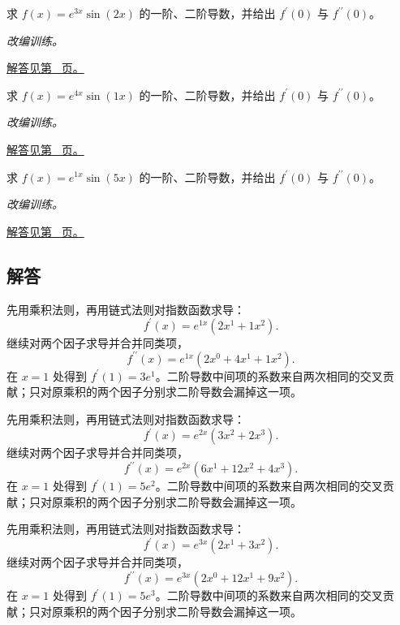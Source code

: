\documentclass[UTF8,12pt,a4paper,fontset=fandol]{ctexart}
\begin{document}
\begin{example}[指数与三角函数的复合求导]\label{ex:c8q22}
求 $f(x)=e^{3x}\sin(2x)$ 的一阶、二阶导数，并给出 $f^{\prime}(0)$ 与 $f^{\prime\prime}(0)$。
\par\textit{改编训练。}\par\hyperref[ans:c8q22]{解答见第~\pageref{ans:c8q22} 页。}
\end{example}
\begin{example}[指数与三角函数的复合求导]\label{ex:c8q23}
求 $f(x)=e^{4x}\sin(1x)$ 的一阶、二阶导数，并给出 $f^{\prime}(0)$ 与 $f^{\prime\prime}(0)$。
\par\textit{改编训练。}\par\hyperref[ans:c8q23]{解答见第~\pageref{ans:c8q23} 页。}
\end{example}
\begin{example}[指数与三角函数的复合求导]\label{ex:c8q24}
求 $f(x)=e^{1x}\sin(5x)$ 的一阶、二阶导数，并给出 $f^{\prime}(0)$ 与 $f^{\prime\prime}(0)$。
\par\textit{改编训练。}\par\hyperref[ans:c8q24]{解答见第~\pageref{ans:c8q24} 页。}
\end{example}
\subsection{解答}
\begin{solve}\label{ans:c8q1}
先用乘积法则，再用链式法则对指数函数求导：
\[
f^{\prime}(x)=e^{1x}(2x^{1}+1x^{2}).
\]
继续对两个因子求导并合并同类项，
\[
f^{\prime\prime}(x)=e^{1x}\left(2x^{0}+4x^{1}+1x^{2}\right).
\]
在 $x=1$ 处得到 $f^{\prime}(1)=3e^{1}$。二阶导数中间项的系数来自两次相同的交叉贡献；只对原乘积的两个因子分别求二阶导数会漏掉这一项。
\end{solve}

\begin{solve}\label{ans:c8q2}
先用乘积法则，再用链式法则对指数函数求导：
\[
f^{\prime}(x)=e^{2x}(3x^{2}+2x^{3}).
\]
继续对两个因子求导并合并同类项，
\[
f^{\prime\prime}(x)=e^{2x}\left(6x^{1}+12x^{2}+4x^{3}\right).
\]
在 $x=1$ 处得到 $f^{\prime}(1)=5e^{2}$。二阶导数中间项的系数来自两次相同的交叉贡献；只对原乘积的两个因子分别求二阶导数会漏掉这一项。
\end{solve}

\begin{solve}\label{ans:c8q3}
先用乘积法则，再用链式法则对指数函数求导：
\[
f^{\prime}(x)=e^{3x}(2x^{1}+3x^{2}).
\]
继续对两个因子求导并合并同类项，
\[
f^{\prime\prime}(x)=e^{3x}\left(2x^{0}+12x^{1}+9x^{2}\right).
\]
在 $x=1$ 处得到 $f^{\prime}(1)=5e^{3}$。二阶导数中间项的系数来自两次相同的交叉贡献；只对原乘积的两个因子分别求二阶导数会漏掉这一项。
\end{solve}
\end{document}
